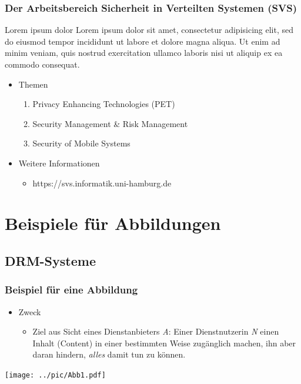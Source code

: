 \documentclass[t,aspectratio=169]{beamer}
\begin{document}
\begin{frame}
	\frametitle{Der Arbeitsbereich Sicherheit in Verteilten Systemen (SVS)}
	\begin{alertblock}{Lorem ipsum dolor}
		Lorem ipsum dolor sit amet, consectetur adipisicing elit, sed do eiusmod tempor incididunt ut labore et dolore magna aliqua. Ut enim ad minim veniam, quis nostrud exercitation ullamco laboris nisi ut aliquip ex ea commodo consequat. 
	\end{alertblock}
	\begin{itemize}
		\item Themen
			\begin{enumerate}
				\item Privacy Enhancing Technologies (PET)
				\item Security Management \& Risk Management
				\item Security of Mobile Systems
			\end{enumerate}
		\item Weitere Informationen
			\begin{itemize}
				\item https://svs.informatik.uni-hamburg.de
			\end{itemize}
	\end{itemize}
\end{frame}

\section{Beispiele für Abbildungen} %

\subsection{DRM-Systeme} %

\begin{frame}
	\transwipe %
	\frametitle{Beispiel für eine Abbildung}
	\begin{itemize}
		\item Zweck
			\begin{itemize}
				\item Ziel aus Sicht eines Dienstanbieters \emph{\color{red} A}: Einer Dienstnutzerin \emph{\color[RGB]{0,128,0} N} einen Inhalt (Content) in einer bestimmten Weise zugänglich machen, ihn aber daran hindern, \emph{alles} damit tun zu können.
				
			\end{itemize}
	\end{itemize}
	\vspace{\fill}
	\begin{center}
		\texttt{[image: ../pic/Abb1.pdf]}
	\end{center}
\end{frame}
\end{document}
